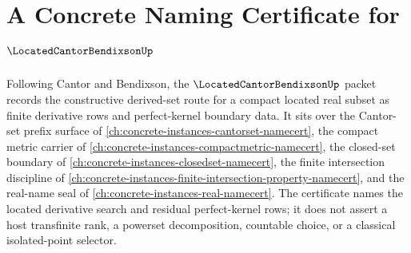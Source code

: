 \chapter{A Concrete Naming Certificate for $\LocatedCantorBendixsonUp$}
\label{ch:concrete-instances-located-cantor-bendixson-namecert}

Following Cantor and Bendixson, the $\LocatedCantorBendixsonUp$ packet records the constructive derived-set route for a compact located real subset as finite derivative rows and perfect-kernel boundary data. It sits over the Cantor-set prefix surface of \autoref{ch:concrete-instances-cantorset-namecert}, the compact metric carrier of \autoref{ch:concrete-instances-compactmetric-namecert}, the closed-set boundary of \autoref{ch:concrete-instances-closedset-namecert}, the finite intersection discipline of \autoref{ch:concrete-instances-finite-intersection-property-namecert}, and the real-name seal of \autoref{ch:concrete-instances-real-namecert}. The certificate names the located derivative search and residual perfect-kernel rows; it does not assert a host transfinite rank, a powerset decomposition, countable choice, or a classical isolated-point selector.

